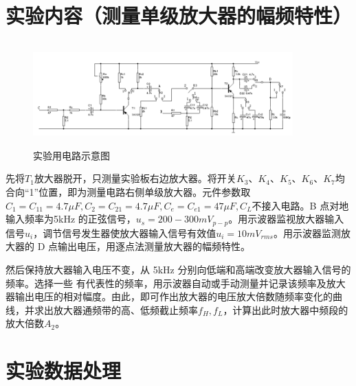 \documentclass[a4 paper,12pt]{article}
\begin{document}
    \section{实验内容（测量单级放大器的幅频特性）}
    		\begin{figure}[H]
    	\centering
    	\includegraphics[width=10cm,height=4cm]  {电路板.png} 
    	\caption{\label{1} 实验用电路示意图}
    	\end{figure}
    先将$T_{1}$放大器脱开，只测量实验板右边放大器。将开关$K_{3}、K_{4}、K_{5}、K_{6}、K_{7}$均合向“1”位置，即为测量电路右侧单级放大器。元件参数取 $C_{1}=C_{11}=4.7\mu F,C_{2}=C_{21}=4.7\mu F,C_{e}=C_{e1}=47\mu F,C_{L}$不接入电路。B 点对地输入频率为5kHz 的正弦信号，$u_{s}=200-300mV_{p-p}$。用示波器监视放大器输入信号$u_{i}$，调节信号发生器使放大器输入信号有效值$u_{i}=10mV_{rms}$。用示波器监测放大器的 D 点输出电压，用逐点法测量放大器的幅频特性。
    \par 然后保持放大器输入电压不变，从 5kHz 分别向低端和高端改变放大器输入信号的频率。选择一些
    有代表性的频率，用示波器自动或手动测量并记录该频率及放大器输出电压的相对幅度。由此，即可作出放大器的电压放大倍数随频率变化的曲线，并求出放大器通频带的高、低频截止频率$f_{H},f_{L}$，计算出此时放大器中频段的放大倍数$A_{2}$。

    \section{实验数据处理}
\end{document}
